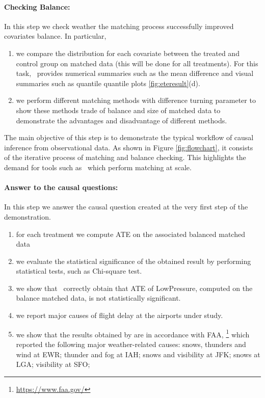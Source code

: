 \paragraph{\bf Checking Balance:}  In this step we check weather the matching process  successfully improved covariates balance. In particular,
    \begin{enumerate}
      \item  we compare the distribution for each covariate between the treated and control group on matched data (this will be done for all treatments). For this task, \GSQL\  provides numerical summaries such as the mean difference and visual summaries such as quantile quantile plots \ref{fig:eteresult}(d).

      \item  we perform different matching methods with difference turning parameter to show these methods trade of balance and size of matched data to demonstrate the advantages and disadvantage of different methods.
       \end{enumerate}
      The main objective of this step is to demonstrate the typical workflow of causal inference from observational data. As shown in Figure \ref{fig:flowchart}, it consists of the iterative process of matching and balance checking. This highlights the demand for tools such as \GSQL\, which perform matching at scale.

     \paragraph{\bf Answer to the causal questions:}  In this step  we answer the causal question created at the very first step of the demonstration.
       \begin{enumerate}
       \item for each treatment we compute ATE on the associated balanced matched data
      \item we evaluate the statistical significance of the obtained result by performing statistical tests, such as Chi-square test.
    \item we show that \GSQL\ correctly obtain that ATE of LowPressure, computed on the balance matched data, is not statistically significant.
        \item we report major causes of flight delay at the airports under study.
    \item   we show that the results obtained by \GSQL are in accordance with
FAA, \footnote{\url{https://www.faa.gov/}} which reported the following major weather-related
causes:
snows, thunders and wind at EWR; thunder and fog at IAH;
snows and visibility at JFK; snows at LGA; visibility at SFO;

        \end{enumerate}



